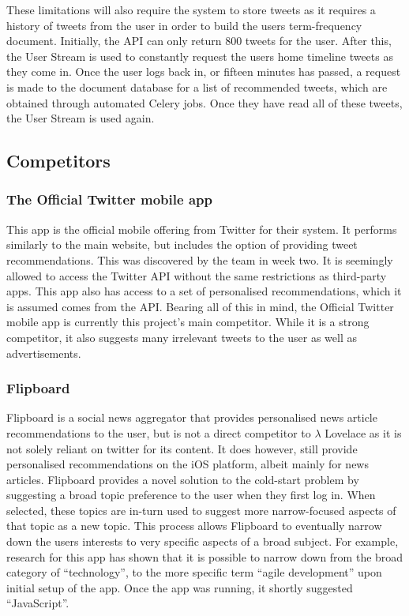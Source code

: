\documentclass{article}
\begin{document}
These limitations will also require the system to store tweets as it requires a history of tweets from the user in order to build the users term-frequency document. Initially, the API can only return 800 tweets for the user. After this, the User Stream is used to constantly request the users home timeline tweets as they come in. Once the user logs back in, or fifteen minutes has passed, a request is made to the document database for a list of recommended tweets, which are obtained through automated Celery\cite{celery} jobs. Once they have read all of these tweets, the User Stream is used again.

\subsection{Competitors}


\subsubsection*{The Official Twitter mobile app}
This app is the official mobile offering from Twitter for their system. It performs similarly to the main website, but includes the option of providing tweet recommendations. This was discovered by the team in week two. It is seemingly allowed to access the Twitter API without the same restrictions as third-party apps. This app also has access to a set of personalised recommendations, which it is assumed comes from the API. Bearing all of this in mind, the Official Twitter mobile app is currently this project's main competitor. While it is a strong competitor, it also suggests many irrelevant tweets to the user as well as advertisements.

\subsubsection*{Flipboard}
Flipboard is a social news aggregator that provides personalised news article recommendations to the user, but is not a direct competitor to $\lambda$ Lovelace as it is not solely reliant on twitter for its content. It does however, still provide personalised recommendations on the iOS platform, albeit mainly for news articles. Flipboard provides a novel solution to the cold-start problem by suggesting a broad topic preference to the user when they first log in. When selected, these topics  are in-turn used to suggest more narrow-focused aspects of that topic as a new topic. This process allows Flipboard to eventually narrow down the users interests to very specific aspects of a broad subject. For example, research for this app has shown that it is possible to narrow down from the broad category of “technology”, to the more specific term “agile development” upon initial setup of the app. Once the app was running, it shortly suggested “JavaScript”.
\end{document}
